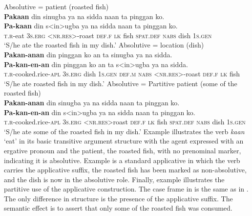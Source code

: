 \ea
    \ea Absolutive = patient (roasted fish) \\
    \label{bkm:Ref396998462}
    \textbf{Pakaan}  din  sinugba  ya  na  sidda  naan  ta pinggan  ko. \\\smallskip
 \gll \textbf{Pa-kaan}  din  s<in>ugba  ya  na  sidda  naan  ta pinggan  ko. \\
    \textsc{t.r}-eat  3\textsc{s.erg}  <\textsc{nr.res}>-roast  \textsc{def.f}  \textsc{lk} fish  \textsc{spat.def}  \textsc{nabs}
    dish  1\textsc{s.gen} \\
    \glt ‘S/he ate the roasted fish in my dish.’
    \ex
    \label{ex:inmydish-1}
    Absolutive = location (dish) \\
    \textbf{Pakan-anan}  din  pinggan  ko  an  ta  sinugba  ya na  sidda. \\\smallskip
 \gll \textbf{Pa-kan-en-an}\footnotemark{}  din  pinggan  ko  an  ta  s<in>ugba  ya na  sidda. \\
    \textsc{t.r}-cooked.rice-\textsc{apl}  3\textsc{s.erg}  dish  1\textsc{s.gen}  \textsc{def.m}  \textsc{nabs} <\textsc{nr.res}>-roast  \textsc{def.f}   \textsc{lk}  fish \\
    \glt ‘S/he ate roasted fish in my dish.' 
    \newpage
    \ex
    \label{ex:inmydish-2}
    Absolutive = Partitive patient (some of the roasted fish) \\
    \textbf{Pakan-anan}  din  sinugba  ya  na  sidda naan  ta pinggan  ko. \\\smallskip
 \gll \textbf{Pa-kan-en-an}  din  s<in>ugba  ya  na  sidda naan  ta pinggan  ko. \\
    \textsc{t.r}-cooked.rice-\textsc{apl}  3\textsc{s.erg}  <\textsc{nr.res}>roast  \textsc{def.f}  \textsc{lk} fish
    \textsc{spat.def}  \textsc{nabs} dish  1\textsc{s.gen} \\
    \glt `S/he ate some of the roasted fish in my dish.’
    \z
\z
Example  illustrates the verb \textit{kaan} ‘eat’ in its basic transitive argument structure with the agent expressed with an ergative pronoun and the patient, the roasted fish, with no prenominal marker, indicating it is absolutive. Example  is a standard applicative in which the verb carries the applicative suffix, the roasted fish has been marked as non-absolutive, and the dish is now in the absolutive role. Finally, example  illustrates the partitive use of the applicative construction. The case frame in  is the same as in . The only difference in structure is the presence of the applicative suffix. The semantic effect is to assert that only some of the roasted fish was consumed.

